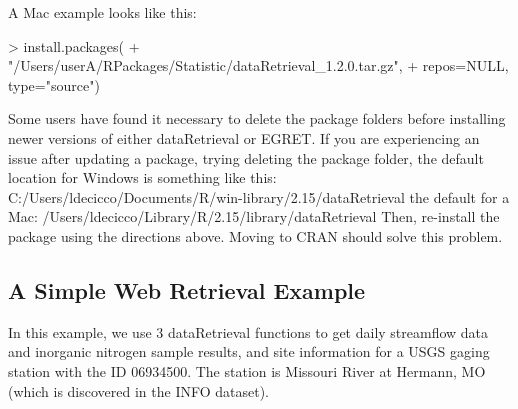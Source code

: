 \documentclass[a4paper,11pt]{article}
\begin{document}
A Mac example looks like this:

\begin{Schunk}
\begin{Sinput}
> install.packages(
+   "/Users/userA/RPackages/Statistic/dataRetrieval_1.2.0.tar.gz", 
+   repos=NULL, type="source")
\end{Sinput}
\end{Schunk}

Some users have found it necessary to delete the package folders before installing newer versions of either dataRetrieval or EGRET. If you are experiencing an issue after updating a package, trying deleting the package folder, the default location for Windows is something like this: C:/Users/ldecicco/Documents/R/win-library/2.15/dataRetrieval the default for a Mac: /Users/ldecicco/Library/R/2.15/library/dataRetrieval Then, re-install the package using the directions above. Moving to CRAN should solve this problem.

\subsection{A Simple Web Retrieval Example}
In this example, we use 3 dataRetrieval functions to get daily streamflow data and inorganic nitrogen sample results, and site information for a USGS gaging station with the ID 06934500.  The station is Missouri River at Hermann, MO (which is discovered in the INFO dataset).
\end{document}
